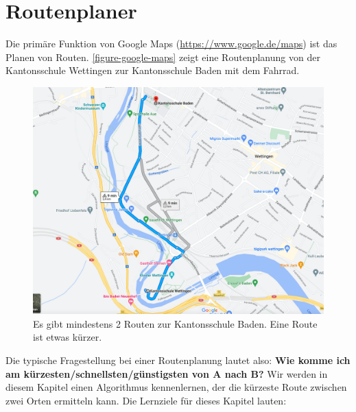 
\toggletrue{image}
\toggletrue{imagehover}

\chapter{Routenplaner}
\label{chapter-routenplaner}

Die primäre Funktion von Google Maps (\url{https://www.google.de/maps}) ist das Planen von Routen. \autoref{figure-google-maps} zeigt eine Routenplanung von der Kantonsschule Wettingen zur Kantonsschule Baden mit dem Fahrrad.

\begin{figure}[htb]
	\centering
	\includegraphics[scale=0.25]{google_maps_kswe_ksb}
	\caption{Es gibt mindestens 2 Routen zur Kantonsschule Baden. Eine Route ist etwas kürzer.}
	\label{figure-google-maps}
\end{figure}

Die typische Fragestellung bei einer Routenplanung lautet also: \textbf{Wie komme ich am kürzesten/schnellsten/günstigsten von A nach B?} Wir werden in diesem Kapitel einen Algorithmus kennenlernen, der die kürzeste Route zwischen zwei Orten ermitteln kann. Die Lernziele für dieses Kapitel lauten:

\newcommand{\routenplanerLernziele}{
\protect\begin{todolist}
\item Sie erklären die Methode der Abstraktion und Gleichformung.
\item Sie modellieren eine Strassenkarte durch einen gewichteten Graphen.
\item Sie erklären, was wir in einem gewichteten Graphen unter einem kürzesten Weg verstehen.
\item Sie erklären, was ein Brute-Force-Algorithmus ist und warum wir diesen für die Routenplanung nicht einsetzen können.
\item Sie wenden den Algorithmus von Dijkstra an.
\end{todolist}
}

